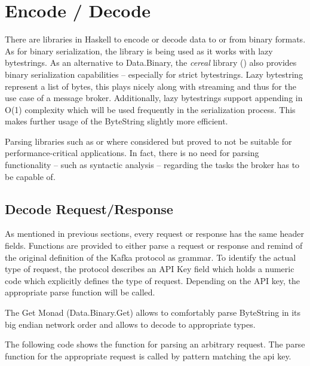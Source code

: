 \section{Encode / Decode}

There are libraries in Haskell to encode or decode data to or from binary
formats. As for binary serialization, the
library is being used as it works with lazy bytestrings. As an alternative to
Data.Binary, the \textit{cereal} library
()
also provides binary serialization capabilities -- especially for strict
bytestrings. Lazy bytestring represent a list of bytes, this plays nicely along
with streaming and thus for the use case of a message broker. Additionally,
lazy bytestrings support appending in O(1) complexity which will be used
frequently in the serialization process. This makes further usage of the
ByteString slightly more efficient.

Parsing libraries such as
 or
 where considered but
proved to not be suitable for performance-critical applications. In fact, there
is no need for parsing functionality -- such as syntactic analysis -- regarding
the tasks the broker has to be capable of.

\subsection{Decode Request/Response}

As mentioned in previous sections, every request or response has the same header
fields. Functions are provided to either parse a request or response and
remind of the original definition of the Kafka protocol as grammar. To identify
the actual type of request, the protocol describes an API Key field which holds
a numeric code which explicitly defines the type of request. Depending on the
API key, the appropriate parse function will be called. 

The Get Monad (Data.Binary.Get) allows to comfortably parse ByteString in
its big endian network order and allows to decode to appropriate types.

The following code shows the function for parsing an arbitrary request. The
parse function for the appropriate request is called by pattern matching the api
key.

